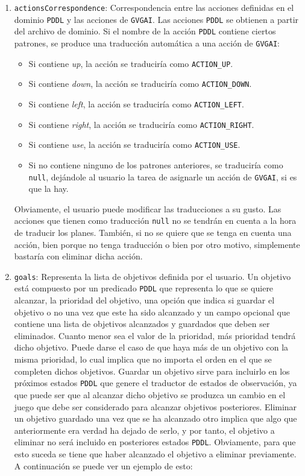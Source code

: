 \begin{enumerate}
    \item \texttt{actionsCorrespondence}: Correspondencia entre las acciones definidas en el dominio
    \texttt{PDDL} y las acciones de \texttt{GVGAI}. Las acciones \texttt{PDDL} se obtienen
    a partir del archivo de dominio. Si el nombre de la acción \texttt{PDDL} contiene ciertos
    patrones, se produce una traducción automática a una acción de \texttt{GVGAI}:
    
    \begin{itemize}[label=\textbullet]
        \item Si contiene \textit{up}, la acción se traduciría como \texttt{ACTION\_UP}.
        \item Si contiene \textit{down}, la acción se traduciría como \texttt{ACTION\_DOWN}.
        \item Si contiene \textit{left}, la acción se traduciría como \texttt{ACTION\_LEFT}.
        \item Si contiene \textit{right}, la acción se traduciría como \texttt{ACTION\_RIGHT}.
        \item Si contiene \textit{use}, la acción se traduciría como \texttt{ACTION\_USE}.
        \item Si no contiene ninguno de los patrones anteriores, se traduciría como \texttt{null},
        dejándole al usuario la tarea de asignarle un acción de \texttt{GVGAI}, si es que la hay.
    \end{itemize}
    
    Obviamente, el usuario puede modificar las traducciones a su gusto. Las acciones que tienen
    como traducción \texttt{null} no se tendrán en cuenta a la hora de traducir los planes. También,
    si no se quiere que se tenga en cuenta una acción, bien porque no tenga traducción o bien por otro
    motivo, simplemente bastaría con eliminar dicha acción.
    
    \item \texttt{goals}: Representa la lista de objetivos definida por el usuario. Un objetivo está compuesto
    por un predicado \texttt{PDDL} que representa lo que se quiere alcanzar, la prioridad del objetivo, una
    opción que indica si guardar el objetivo o no una vez que este ha sido alcanzado y un campo opcional
    que contiene una lista de objetivos alcanzados y guardados que deben ser eliminados. Cuanto menor
    sea el valor de la prioridad, más prioridad tendrá dicho objetivo. Puede darse el caso de que haya
    más de un objetivo con la misma prioridad, lo cual implica que no importa el orden en el que se
    completen dichos objetivos. Guardar un objetivo sirve para incluirlo en los próximos estados \texttt{PDDL}
    que genere el traductor de estados de observación, ya que puede ser que al alcanzar dicho objetivo
    se produzca un cambio en el juego que debe ser considerado para alcanzar objetivos posteriores.
    Eliminar un objetivo guardado una vez que se ha alcanzado otro implica que algo que anteriormente
    era verdad ha dejado de serlo, y por tanto, el objetivo a eliminar no será incluido en posteriores
    estados \texttt{PDDL}. Obviamente, para que esto suceda se tiene que haber alcanzado el objetivo a
    eliminar previamente. A continuación se puede ver un ejemplo de esto:
    

\end{enumerate}
